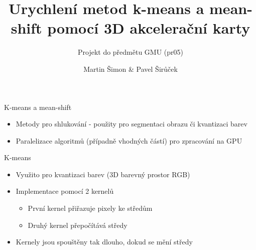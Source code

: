 \documentclass{beamer}
\title{Urychlení metod k-means a mean-shift pomocí 3D akcelerační karty}
\subtitle{Projekt do předmětu GMU (pr05)}
\author[Martin Šimon \& Pavel Širůček]{Martin Šimon \& Pavel Širůček}
\institute{Vysoké učení technické v Brně - Fakulta informačních technologií}
\date{}
\begin{document}
\begin{frame}[plain]
  \titlepage 
\end{frame}
\addtocounter{framenumber}{-1}


\begin{frame}{K-means a mean-shift}
  \begin{itemize}
    \medskip
    \item Metody pro shlukování - použity pro segmentaci obrazu či kvantizaci barev
    \medskip
    \item Paralelizace algoritmů (případně vhodných částí) pro zpracování na GPU
    \medskip
  \end{itemize}
\end{frame}


\begin{frame}{K-means}
  \begin{itemize}
    \item Využito pro kvantizaci barev (3D barevný prostor RGB)
    \medskip
    \item Implementace pomocí 2 kernelů
    \medskip
      \begin{itemize}
        \item První kernel přiřazuje pixely ke středům
        \medskip
        \item Druhý kernel přepočítává středy
        \medskip
      \end{itemize}
    \item Kernely jsou spouštěny tak dlouho, dokud se mění středy
    \medskip
  \end{itemize}
\end{frame}
\end{document}
